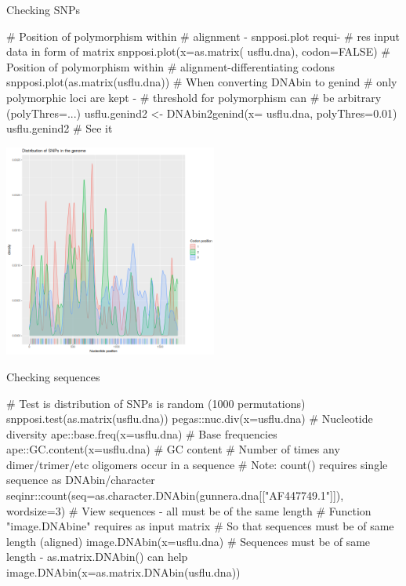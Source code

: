\documentclass[compress, ucs, xelatex, 11pt, xcolor=svgnames, aspectratio=169,
	hyperref={
		bookmarks=true,
		unicode=true,
		colorlinks=true,
		pdftitle={Molecular data in R},
		plainpages=false,
		pdfauthor={Vojtech Zeisek},
		pdfsubject={Course about phylogeny and evolution in R},
		pdfcreator={XeLaTeX},
		pdfkeywords={R, evolution, phylogeny, molecular data},
		linkcolor=Crimson, %
		anchorcolor=Magenta, %
		citecolor=Magenta, %
		filecolor=Magenta, %
		menucolor=Magenta, %
		urlcolor=DodgerBlue, %
		pdftex},
	url={hyphens, lowtilde} %
	]{beamer}
\begin{document}
\begin{frame}[fragile]{Checking SNPs}
	\begin{multicols}{2}
		\begin{spluscode}
    # Position of polymorphism within
    # alignment - snpposi.plot requi-
    # res input data in form of matrix
    snpposi.plot(x=as.matrix(
      usflu.dna), codon=FALSE)
    # Position of polymorphism within
    # alignment-differentiating codons
    snpposi.plot(as.matrix(usflu.dna))
    # When converting DNAbin to genind
    # only polymorphic loci are kept -
    # threshold for polymorphism can
    # be arbitrary (polyThres=...)
    usflu.genind2 <- DNAbin2genind(x=
      usflu.dna, polyThres=0.01)
    usflu.genind2 # See it
		\end{spluscode}
		\begin{flushright}
			\includegraphics[height=7cm]{snpposi.png}
		\end{flushright}
	\end{multicols}
\end{frame}

\begin{frame}[fragile]{Checking sequences}
	\begin{spluscode}
    # Test is distribution of SNPs is random (1000 permutations)
    snpposi.test(as.matrix(usflu.dna))
    pegas::nuc.div(x=usflu.dna) # Nucleotide diversity
    ape::base.freq(x=usflu.dna) # Base frequencies
    ape::GC.content(x=usflu.dna) # GC content
    # Number of times any dimer/trimer/etc oligomers occur in a sequence
    # Note: count() requires single sequence as DNAbin/character
    seqinr::count(seq=as.character.DNAbin(gunnera.dna[["AF447749.1"]]),
      wordsize=3)
    # View sequences - all must be of the same length
    # Function "image.DNAbine" requires as input matrix
    # So that sequences must be of same length (aligned)
    image.DNAbin(x=usflu.dna)
    # Sequences must be of same length - as.matrix.DNAbin() can help
    image.DNAbin(x=as.matrix.DNAbin(usflu.dna))
	\end{spluscode}
\end{frame}
\end{document}

